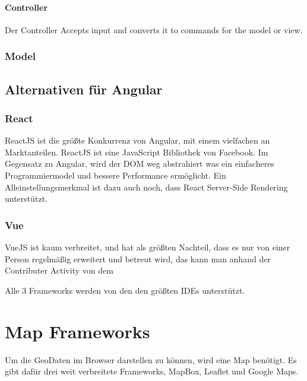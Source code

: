 \paragraph{Controller}
Der Controller 
Accepts input and converts it to commands for the model or view.




\subsubsection{Model}

\subsection{Alternativen für Angular}

\subsubsection{React}
ReactJS ist die größte Konkurrenz von Angular, mit einem vielfachen an Marktanteilen.
ReactJS ist eine JavaScript Bibliothek von Facebook. Im Gegensatz zu Angular, wird der DOM weg abstrahiert was ein einfacheres 
Programmiermodel und bessere Performance ermöglicht. Ein Alleinstellungsmerkmal ist dazu auch noch, dass React Server-Side Rendering 
unterstützt.

\subsubsection{Vue}
VueJS ist kaum verbreitet, und hat als größten Nachteil, dass es nur von einer Person regelmäßig erweitert und betreut wird, das kann man anhand der Contributer Activity von dem 


Alle 3 Frameworks werden von den den größten IDEs unterstützt.

\section{Map Frameworks}
Um die GeoDaten im Browser darstellen zu können, wird eine Map benötigt. Es gibt dafür drei weit verbreitete Frameworks, MapBox, Leaflet und Google Maps.

